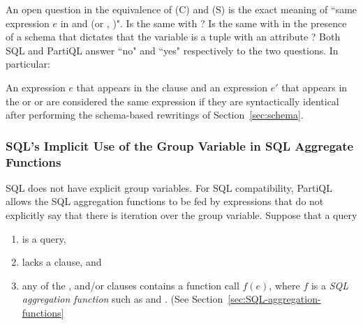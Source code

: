  An open question in the
equivalence of (C) and (S) is the exact meaning of ``same expression $e$ in
 and  (or , )". Is 
the same with ? Is  the same with  in the
presence of a schema that dictates that the variable  is a tuple with an
attribute ? Both SQL and PartiQL answer ``no" and ``yes" respectively to
the two questions. In particular:

An expression $e$ that appears in the  clause and an expression
$e'$ that appears in the  or  or  are
considered the same expression if they are syntactically identical after
performing the schema-based rewritings of Section~\ref{sec:schema}.

\subsubsection{SQL's Implicit Use of the Group Variable in SQL Aggregate Functions} 
\label{sec:implicit-group-variable}

SQL does not have explicit group variables. For SQL compatibility, PartiQL
allows the SQL aggregation functions to be fed by expressions that do not
explicitly say that there is iteration over the group variable. Suppose that a
query

\begin{enumerate}
\item is a  query,
\item lacks a  clause, and
\item any of the ,  and/or  clauses contains
a function call $f(e)$, where $f$ is a \textit{SQL aggregation function} such as
 and . (See Section~\ref{sec:SQL-aggregation-functions} 
\end{enumerate}

